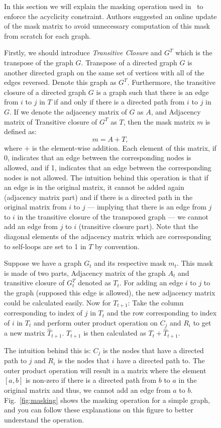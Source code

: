 \documentclass{lxaiproposal}
\begin{document}
\begin{figure}[h]
    In this section we will explain the masking operation used in~\cite{deleu2022daggflownet} to enforce the acyclicity
    constraint. Authors suggested an online update of the mask matrix to avoid unnecessary computation of this mask
    from scratch for each graph.

    Firstly, we should introduce \textit{Transitive Closure} and $G^T$ which is the transpose of the graph $G$.
    Transpose of a directed graph $G$ is another directed graph on the same set of vertices with all of the edges
    reversed. Denote this graph as $G^T$. Furthermore, the transitive closure of a directed graph $G$ is a graph
    such that there is an edge from $i$ to $j$ in $T$ if and only if there is a directed path from $i$ to $j$ in
    $G$. If we denote the adjacency matrix of $G$ as $A$, and Adjacency matrix of Transitive closure of $G^T$ as $T$,
    then the mask matrix $m$ is defined as:
    \[
        m = A + T,
    \]
    where $+$ is the element-wise addition.
    Each element of this matrix, if 0, indicates that an edge between the corresponding nodes is allowed, and if 1,
    indicates that an edge between the corresponding nodes is not allowed. The intuition behind this operation is
    that if an edge is in the original matrix, it cannot be added again (adjacency matrix part) and if there is a
    directed path in the original matrix from $i$ to $j$ --- implying that there is an edge from $j$ to $i$ in the
    transitive closure of the transposed graph --- we cannot add an edge from $j$ to $i$ (transitive closure part).
    Note that the diagonal elements of the adjacency matrix which are corresponding to self-loops are set to 1 in $T$
    by convention.

    Suppose we have a graph $G_t$ and its respective mask $m_t$. This mask is made of two parts, Adjacency matrix of
    the graph $A_t$ and transitive closure of $G_t^T$ denoted as $T_{t}$. For adding an edge $i$ to $j$ to the
    graph (supposed this edge is allowed), the new adjacency matrix could be calculated easily. Now for $T_{t+1}$:
    Take the column corresponding to index of $j$ in $T_t$ and the row corresponding to index of $i$ in $T_t$ and
    perform outer product operation on $C_j$ and $R_i$ to get a new matrix $\hat{T}_{t+1}$. $T_{t+1}$ is then
    calculated as $T_t + \hat{T}_{t+1}$.

    The intuition behind this is: $C_j$ is the nodes that have a directed path to $j$ and $R_i$ is the nodes that
    $i$ have a directed path to. The outer product operation will result in a matrix where the element $[a, b]$ is
    non-zero if there is a directed path from $b$ to $a$ in the original matrix and thus, we cannot add an edge from
    $a$ to $b$. Fig.~\ref{fig:masking} shows the masking operation for a simple graph, and you can follow these
    explanations on this figure to better understand the operation.


\end{figure}
\end{document}
